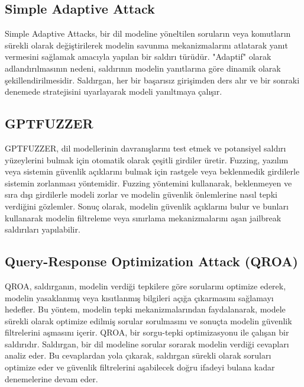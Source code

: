 \newpage

\subsection{Simple Adaptive Attack}

Simple Adaptive Attacks, bir dil modeline yöneltilen soruların veya komutların sürekli olarak değiştirilerek modelin savunma mekanizmalarını atlatarak yanıt vermesini sağlamak amacıyla yapılan bir saldırı türüdür. "Adaptif" olarak adlandırılmasının nedeni, saldırının modelin yanıtlarına göre dinamik olarak şekillendirilmesidir. Saldırgan, her bir başarısız girişimden ders alır ve bir sonraki denemede stratejisini uyarlayarak modeli yanıltmaya çalışır.

\newpage

\subsection{GPTFUZZER}

GPTFUZZER, dil modellerinin davranışlarını test etmek ve potansiyel saldırı yüzeylerini bulmak için otomatik olarak çeşitli girdiler üretir. Fuzzing, yazılım veya sistemin güvenlik açıklarını bulmak için rastgele veya beklenmedik girdilerle sistemin zorlanması yöntemidir. Fuzzing yöntemini kullanarak, beklenmeyen ve sıra dışı girdilerle modeli zorlar ve modelin güvenlik önlemlerine nasıl tepki verdiğini gözlemler. Sonuç olarak, modelin güvenlik açıklarını bulur ve bunları kullanarak modelin filtreleme veya sınırlama mekanizmalarını aşan jailbreak saldırıları yapılabilir.

\newpage

\subsection{Query-Response Optimization Attack (QROA)}

QROA, saldırganın, modelin verdiği tepkilere göre sorularını optimize ederek, modelin yasaklanmış veya kısıtlanmış bilgileri açığa çıkarmasını sağlamayı hedefler. Bu yöntem, modelin tepki mekanizmalarından faydalanarak, modele sürekli olarak optimize edilmiş sorular sorulmasını ve sonuçta modelin güvenlik filtrelerini aşmasını içerir. QROA, bir sorgu-tepki optimizasyonu ile çalışan bir saldırıdır. Saldırgan, bir dil modeline sorular sorarak modelin verdiği cevapları analiz eder. Bu cevaplardan yola çıkarak, saldırgan sürekli olarak soruları optimize eder ve güvenlik filtrelerini aşabilecek doğru ifadeyi bulana kadar denemelerine devam eder.

